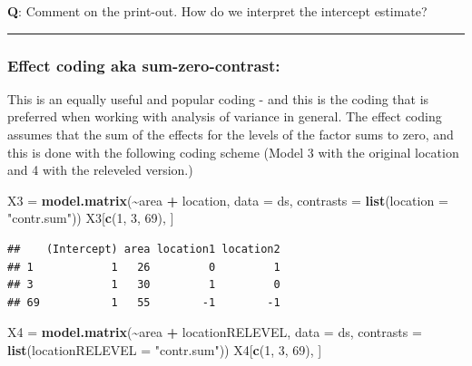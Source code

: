 \documentclass[
]{article}
\newenvironment{Shaded}{\begin{snugshade}}{\end{snugshade}}
\newcommand{\AttributeTok}[1]{\textcolor[rgb]{0.13,0.29,0.53}{#1}}
\newcommand{\DecValTok}[1]{\textcolor[rgb]{0.00,0.00,0.81}{#1}}
\newcommand{\FunctionTok}[1]{\textcolor[rgb]{0.13,0.29,0.53}{\textbf{#1}}}
\newcommand{\NormalTok}[1]{#1}
\newcommand{\OtherTok}[1]{\textcolor[rgb]{0.56,0.35,0.01}{#1}}
\newcommand{\SpecialCharTok}[1]{\textcolor[rgb]{0.81,0.36,0.00}{\textbf{#1}}}
\newcommand{\StringTok}[1]{\textcolor[rgb]{0.31,0.60,0.02}{#1}}
\begin{document}
\textbf{Q}: Comment on the print-out. How do we interpret the intercept
estimate?

\begin{center}\rule{0.5\linewidth}{0.5pt}\end{center}

\hypertarget{effect-coding-aka-sum-zero-contrast}{%
\subsubsection{Effect coding aka
sum-zero-contrast:}\label{effect-coding-aka-sum-zero-contrast}}

This is an equally useful and popular coding - and this is the coding
that is preferred when working with analysis of variance in general. The
effect coding assumes that the sum of the effects for the levels of the
factor sums to zero, and this is done with the following coding scheme
(Model 3 with the original location and 4 with the releveled version.)

\begin{Shaded}
\begin{Highlighting}[]
\NormalTok{X3 }\OtherTok{=} \FunctionTok{model.matrix}\NormalTok{(}\SpecialCharTok{\textasciitilde{}}\NormalTok{area }\SpecialCharTok{+}\NormalTok{ location, }\AttributeTok{data =}\NormalTok{ ds, }\AttributeTok{contrasts =} \FunctionTok{list}\NormalTok{(}\AttributeTok{location =} \StringTok{"contr.sum"}\NormalTok{))}
\NormalTok{X3[}\FunctionTok{c}\NormalTok{(}\DecValTok{1}\NormalTok{, }\DecValTok{3}\NormalTok{, }\DecValTok{69}\NormalTok{), ]}
\end{Highlighting}
\end{Shaded}

\begin{verbatim}
##    (Intercept) area location1 location2
## 1            1   26         0         1
## 3            1   30         1         0
## 69           1   55        -1        -1
\end{verbatim}

\begin{Shaded}
\begin{Highlighting}[]
\NormalTok{X4 }\OtherTok{=} \FunctionTok{model.matrix}\NormalTok{(}\SpecialCharTok{\textasciitilde{}}\NormalTok{area }\SpecialCharTok{+}\NormalTok{ locationRELEVEL, }\AttributeTok{data =}\NormalTok{ ds, }\AttributeTok{contrasts =} \FunctionTok{list}\NormalTok{(}\AttributeTok{locationRELEVEL =} \StringTok{"contr.sum"}\NormalTok{))}
\NormalTok{X4[}\FunctionTok{c}\NormalTok{(}\DecValTok{1}\NormalTok{, }\DecValTok{3}\NormalTok{, }\DecValTok{69}\NormalTok{), ]}
\end{Highlighting}
\end{Shaded}
\end{document}
